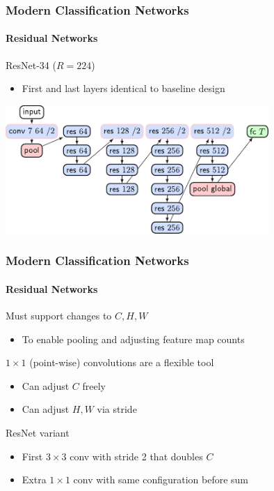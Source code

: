 \documentclass[xetex,professionalfont]{beamer}
\renewcommand\emph[1]{\textcolor{tuwcvl_cvl_blue}{#1}}
\begin{document}
\begin{frame}
	\frametitle{Modern Classification Networks}
	\framesubtitle{Residual Networks}

	ResNet-34 ($R=224$)
	\begin{itemize}
		\item First and last layers identical to baseline design
	\end{itemize}

	\medskip

	\begin{center}
		\includegraphics[width=10cm]{images/resnet-34-graph}
	\end{center}

\end{frame}


\begin{frame}
	\frametitle{Modern Classification Networks}
	\framesubtitle{Residual Networks}

	Must support changes to $C,H,W$
	\begin{itemize}
		\item To enable pooling and adjusting feature map counts
	\end{itemize}

	\bigskip

	$1\times1$ (\emph{point-wise}) convolutions are a flexible tool
	\begin{itemize}
		\item Can adjust $C$ freely
		\item Can adjust $H,W$ via stride
	\end{itemize}

	\bigskip

	ResNet variant
	\begin{itemize}
		\item First $3\times3$ conv with stride 2 that doubles $C$
		\item Extra $1\times1$ conv with same configuration before sum
	\end{itemize}

\end{frame}
\end{document}
